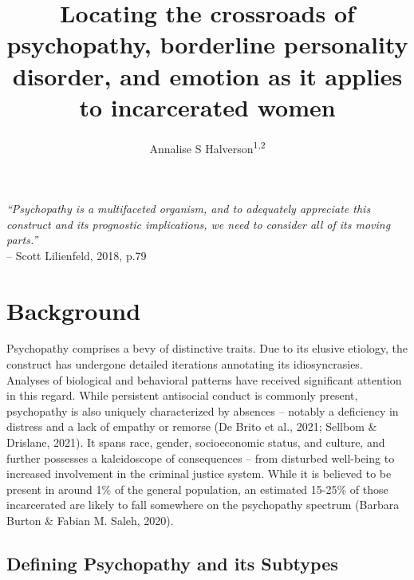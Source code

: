 \documentclass[
  man,floatsintext]{apa7}
\title{Locating the crossroads of psychopathy, borderline personality disorder, and emotion as it applies to incarcerated women}
\author{Annalise S Halverson\textsuperscript{1,2}}
\date{}
\affiliation{\vspace{0.5cm}\textsuperscript{1} University of Chicago\\\textsuperscript{2} Department of Psychology}
\begin{document}
\maketitle

\emph{``Psychopathy is a multifaceted organism, and to adequately appreciate this construct and its prognostic implications, we need to consider all of its moving parts.''}\\
\hfill -- Scott Lilienfeld, 2018, p.79

\hypertarget{background}{%
\section{Background}\label{background}}

Psychopathy comprises a bevy of distinctive traits. Due to its elusive etiology, the construct has undergone detailed iterations annotating its idiosyncrasies. Analyses of biological and behavioral patterns have received significant attention in this regard. While persistent antisocial conduct is commonly present, psychopathy is also uniquely characterized by absences -- notably a deficiency in distress and a lack of empathy or remorse (De Brito et al., 2021; Sellbom \& Drislane, 2021). It spans race, gender, socioeconomic status, and culture, and further possesses a kaleidoscope of consequences -- from disturbed well-being to increased involvement in the criminal justice system. While it is believed to be present in around 1\% of the general population, an estimated 15-25\% of those incarcerated are likely to fall somewhere on the psychopathy spectrum (Barbara Burton \& Fabian M. Saleh, 2020).

\hypertarget{defining-psychopathy-and-its-subtypes}{%
\subsection{Defining Psychopathy and its Subtypes}\label{defining-psychopathy-and-its-subtypes}}
\end{document}
